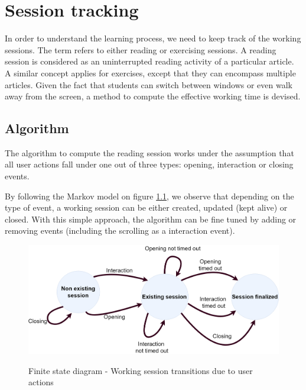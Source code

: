 \chapter{Session tracking}\label{p02:session_tracking}

In order to understand the learning process, we need to keep track of the working sessions. The term refers to either reading or exercising sessions. A reading session is considered as an uninterrupted reading activity of a particular article. A similar concept applies for exercises, except that they can encompass multiple articles. Given the fact that students can switch between windows or even walk away from the screen, a method to compute the effective working time is devised. 

\section{Algorithm}
The algorithm to compute the reading session works under the assumption that all user actions fall under one out of three types: opening, interaction or closing events.

By following the Markov model on figure \ref{fig:markov_diagram}, we observe that depending on the type of event, a working session can be either created, updated (kept alive) or closed. With this simple approach, the algorithm can be fine tuned by adding or removing events (\Eg including the scrolling as a interaction event).

\begin{figure}[bth]
	{\includegraphics[width=1\linewidth]{gfx/Finite_state_machine_diagramv2}} \quad
	\caption[Finite state diagram - Working session transitions due to user actions]{Finite state diagram - Working session transitions due to user actions}\label{fig:markov_diagram}
\end{figure}

